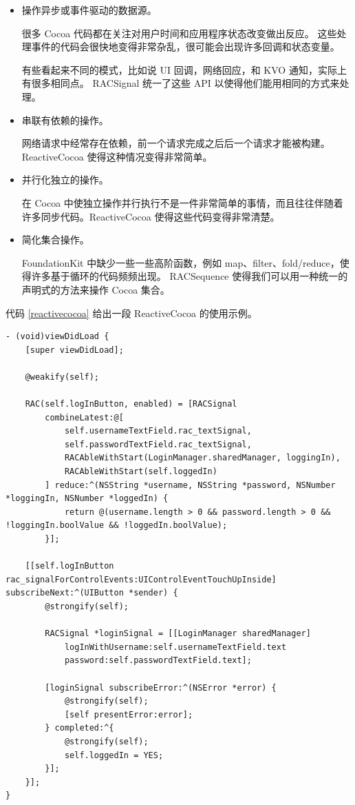 \begin{itemize}

\item 操作异步或事件驱动的数据源。

很多 Cocoa 代码都在关注对用户时间和应用程序状态改变做出反应。
这些处理事件的代码会很快地变得非常杂乱，很可能会出现许多回调和状态变量。

有些看起来不同的模式，比如说 UI 回调，网络回应，和 KVO 通知，实际上有很多相同点。
RACSignal 统一了这些 API 以使得他们能用相同的方式来处理。

\item 串联有依赖的操作。

网络请求中经常存在依赖，前一个请求完成之后后一个请求才能被构建。ReactiveCocoa 使得这种情况变得非常简单。

\item 并行化独立的操作。

在 Cocoa 中使独立操作并行执行不是一件非常简单的事情，而且往往伴随着许多同步代码。ReactiveCocoa 使得这些代码变得非常清楚。

\item 简化集合操作。

FoundationKit 中缺少一些一些高阶函数，例如 map、filter、fold/reduce，使得许多基于循环的代码频频出现。
RACSequence 使得我们可以用一种统一的声明式的方法来操作 Cocoa 集合。

\end{itemize}

代码 \ref{reactivecocoa} 给出一段 ReactiveCocoa 的使用示例。

\begin{minipage}{\textwidth}
\begin{lstlisting}[caption=ReactiveCocoa 示例, label=reactivecocoa]
- (void)viewDidLoad {
    [super viewDidLoad];

    @weakify(self);

    RAC(self.logInButton, enabled) = [RACSignal
        combineLatest:@[
            self.usernameTextField.rac_textSignal,
            self.passwordTextField.rac_textSignal,
            RACAbleWithStart(LoginManager.sharedManager, loggingIn),
            RACAbleWithStart(self.loggedIn)
        ] reduce:^(NSString *username, NSString *password, NSNumber *loggingIn, NSNumber *loggedIn) {
            return @(username.length > 0 && password.length > 0 && !loggingIn.boolValue && !loggedIn.boolValue);
        }];

    [[self.logInButton rac_signalForControlEvents:UIControlEventTouchUpInside] subscribeNext:^(UIButton *sender) {
        @strongify(self);

        RACSignal *loginSignal = [[LoginManager sharedManager]
            logInWithUsername:self.usernameTextField.text
            password:self.passwordTextField.text];

        [loginSignal subscribeError:^(NSError *error) {
            @strongify(self);
            [self presentError:error];
        } completed:^{
            @strongify(self);
            self.loggedIn = YES;
        }];
    }];
}
\end{lstlisting}
\end{minipage}

